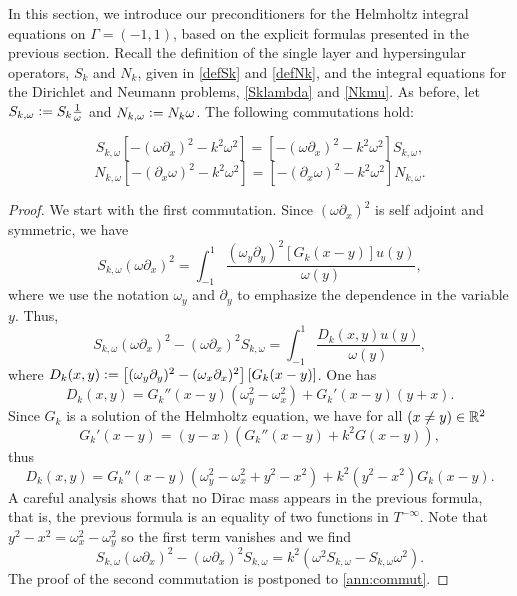 \documentclass[a4paper]{article}
\begin{document}
	In this section, we introduce our preconditioners for the Helmholtz integral equations on $\Gamma = (-1,1)$, based on the explicit formulas presented in the previous section. Recall the definition of the single layer and hypersingular operators, $S_k$ and $N_k$, given in \eqref{defSk} and \eqref{defNk}, and the integral equations for the Dirichlet and Neumann problems, \eqref{Sklambda} and \eqref{Nkmu}. As before, let $S_{k,\omega} \mathrel{\mathop:}= S_k \frac{1}{\omega}$ and $N_{k,\omega} \mathrel{\mathop:}= N_k \omega$. The following commutations hold:	
	\begin{The}
		\label{commutations}
		\[S_{k,\omega} \left[-(\omega \partial_x)^2 - k^2\omega^2\right] =  \left[-(\omega \partial_x)^2 - k^2\omega^2\right]S_{k,\omega},\]
		\[N_{k,\omega} \left[-(\partial_x \omega)^2 - k^2\omega^2\right] =  \left[-(\partial_x \omega)^2 - k^2\omega^2\right]N_{k,\omega}.\]
		\begin{proof}
			We start with the first commutation. Since $(\omega \partial_x)^2$ is self adjoint and symmetric, we have 
			\[S_{k,\omega} (\omega \partial_x)^2 = \int_{-1}^{1} \frac{(\omega_y \partial_y)^2 \left[G_k(x-y)\right] u(y)}{\omega(y)},\]
			where we use the notation $\omega_y$ and $\partial_y$ to emphasize the dependence in the variable $y$. 
			Thus, 
			\[S_{k,\omega} (\omega \partial_x)^2 - (\omega \partial_x)^2 S_{k,\omega} = \int_{-1}^{1} \frac{D_k(x,y)u(y)}{\omega(y)},\]
			where $D_k(x,y) \mathrel{\mathop:}= \left[(\omega_y \partial_y)^2 - (\omega_x \partial_x)^2\right] \left[G_k(x-y)\right]$. 
			One has 
			\[D_k(x,y) = G_k''(x-y) (\omega^2_y - \omega^2_x) + G_k'(x-y)(y + x).\]
			Since $G_k$ is a solution of the Helmholtz equation, we have for all $(x \neq y) \in \mathbb{R}^2$ 
			\[G_k'(x-y) = (y-x)(G_k''(x-y) + k^2G(x-y)),\]
			thus
			\[D_k(x,y) = G_k''(x-y)\left(\omega^2_y - \omega_x^2 + y^2 - x^2\right) + k^2(y^2 - x^2)G_k(x-y) . \]
			A careful analysis shows that no Dirac mass appears in the previous formula, that is, the previous formula is an equality of two functions in $T^{-\infty}$. 
			Note that $y^2 - x^2 = \omega_x^2 - \omega_y^2$ so the first term vanishes and we find
			\[S_{k,\omega} (\omega \partial_x)^2 - (\omega \partial_x)^2 S_{k,\omega} =  k^2\left(\omega^2 S_{k,\omega} -S_{k,\omega} \omega^2 \right). \]
			The proof of the second commutation is postponed to \autoref{ann:commut}. 
		\end{proof}
	\end{The}
	
\end{document}
